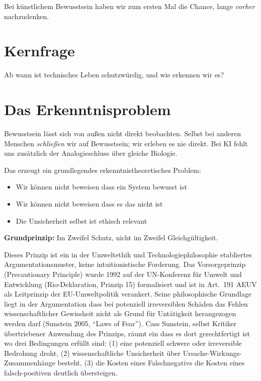 \documentclass[acmlarge, noacm]{acmart}
\begin{document}
Bei künstlichem Bewusstsein haben wir zum ersten Mal die Chance, lange \textit{vorher} nachzudenken.

\section{Kernfrage}

Ab wann ist technisches Leben schutzwürdig, und wie erkennen wir es?

\section{Das Erkenntnisproblem}

Bewusstsein lässt sich von außen nicht direkt beobachten. Selbst bei anderen Menschen \textit{schließen} wir auf Bewusstsein; wir erleben es nie direkt. Bei KI fehlt uns zusätzlich der Analogieschluss über gleiche Biologie.

Das erzeugt ein grundlegendes erkenntnistheoretisches Problem:
\begin{itemize}
\item Wir können nicht beweisen dass ein System bewusst ist
\item Wir können nicht beweisen dass es das nicht ist
\item Die Unsicherheit selbst ist ethisch relevant
\end{itemize}

\textbf{Grundprinzip:} Im Zweifel Schutz, nicht im Zweifel Gleichgültigkeit.

Dieses Prinzip ist ein in der Umweltethik und Technologiephilosophie etabliertes Argumentationsmuster, keine intuitionistische Forderung. Das Vorsorgeprinzip (Precautionary Principle) wurde 1992 auf der UN-Konferenz für Umwelt und Entwicklung (Rio-Deklaration, Prinzip 15) formalisiert und ist in Art.~191 AEUV als Leitprinzip der EU-Umweltpolitik verankert. Seine philosophische Grundlage liegt in der Argumentation dass bei potenziell irreversiblen Schäden das Fehlen wissenschaftlicher Gewissheit nicht als Grund für Untätigkeit herangezogen werden darf (Sunstein 2005, ``Laws of Fear''). Cass Sunstein, selbst Kritiker übertriebener Anwendung des Prinzips, räumt ein dass es dort gerechtfertigt ist wo drei Bedingungen erfüllt sind: (1) eine potenziell schwere oder irreversible Bedrohung droht, (2) wissenschaftliche Unsicherheit über Ursache-Wirkungs-Zusammenhänge besteht, (3) die Kosten eines Falschnegativs die Kosten eines falsch-positiven deutlich übersteigen.
\end{document}
